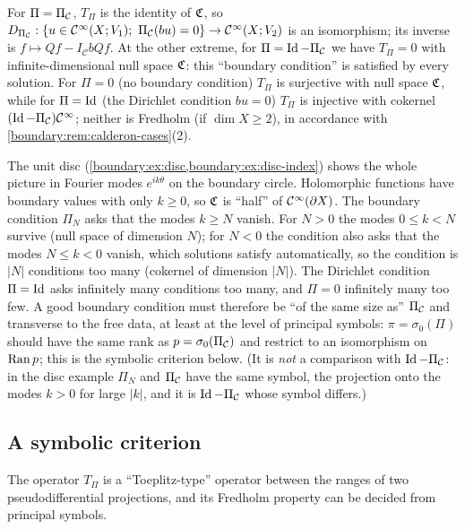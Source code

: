 \begin{example}\label{boundary:ex:calderon-realization}
For $\Pi=\Pi_{\mathcal{C}}$, $T_\Pi$ is the identity of $\mathfrak{C}$, so $D_{\Pi_{\mathcal{C}}}:\{u\in\mathcal{C}^\infty(X;V_1);\
\Pi_{\mathcal{C}}(bu)=0\}\to\mathcal{C}^\infty(X;V_2)$ is an isomorphism; its inverse is $f\mapsto Qf-I_{\mathcal C}
bQf$. At the other extreme, for $\Pi=\operatorname{Id}-\Pi_{\mathcal{C}}$ we have $T_\Pi=0$ with infinite-dimensional
null space $\mathfrak{C}$: this ``boundary condition'' is satisfied by every solution. For
$\Pi=0$ (no boundary condition) $T_\Pi$ is surjective with null space $\mathfrak{C}$, while for
$\Pi=\operatorname{Id}$ (the Dirichlet condition $bu=0$) $T_\Pi$ is injective with cokernel
$(\operatorname{Id}-\Pi_{\mathcal{C}})\mathcal{C}^\infty$; neither is Fredholm (if $\dim X\ge2$), in accordance with
\cref{boundary:rem:calderon-cases}(2).
\end{example}

\begin{discussion}
The unit disc (\cref{boundary:ex:disc,boundary:ex:disc-index}) shows the whole
picture in Fourier modes $e^{ik\theta}$ on the boundary circle. Holomorphic
functions have boundary values with only $k\ge0$, so $\mathfrak{C}$ is ``half'' of
$\mathcal{C}^\infty(\partial X)$. The boundary condition $\Pi_N$ asks that the modes $k\ge N$ vanish. For
$N>0$ the modes $0\le k<N$ survive (null space of dimension $N$); for $N<0$ the
condition also asks that the modes $N\le k<0$ vanish, which solutions satisfy
automatically, so the condition is $|N|$ conditions too many (cokernel of dimension
$|N|$). The Dirichlet condition $\Pi=\operatorname{Id}$ asks infinitely many conditions too many,
and $\Pi=0$ infinitely many too few. A good boundary condition must therefore be
``of the same size as'' $\Pi_{\mathcal{C}}$ and transverse to the free data, at least at the level of
principal symbols: $\pi=\sigma_0(\Pi)$ should have the same rank as $p=\sigma_0(\Pi_{\mathcal{C}})$
and restrict to an isomorphism on $\operatorname{Ran} p$; this is the symbolic criterion below. (It
is \emph{not} a comparison with $\operatorname{Id}-\Pi_{\mathcal{C}}$: in the disc example $\Pi_N$ and $\Pi_{\mathcal{C}}$
have the same symbol, the projection onto the modes $k>0$ for large $|k|$, and it is
$\operatorname{Id}-\Pi_{\mathcal{C}}$ whose symbol differs.)
\end{discussion}

\subsection*{A symbolic criterion}
The operator $T_\Pi$ is a ``Toeplitz-type'' operator between the ranges of two
pseudodifferential projections, and its Fredholm property can be decided from principal
symbols.

